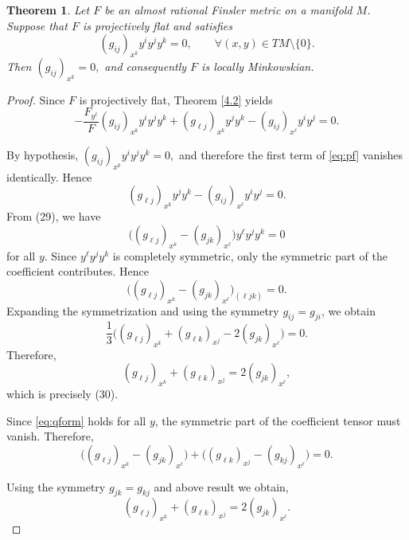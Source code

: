 \documentclass[12pt]{article}
\newtheorem{theorem}{Theorem}[section]
\theoremstyle{definition}
\begin{document}
								\begin{theorem}
									Let $F$ be an almost rational Finsler metric on a manifold $M$. Suppose that $F$ is projectively flat and satisfies
									\[
									(g_{ij})_{x^k}y^iy^jy^k=0,
									\qquad
									\forall (x,y)\in TM\setminus\{0\}.
									\]
									Then $(g_{ij})_{x^k}=0,$ and consequently $F$ is locally Minkowskian.
								\end{theorem}
								
								\begin{proof}
									Since $F$ is projectively flat, Theorem \ref{4.2} yields
									\begin{equation}
									-\frac{F_{y^\ell}}{F}(g_{ij})_{x^k}y^iy^jy^k
									+(g_{\ell j})_{x^k}y^jy^k
									-(g_{ij})_{x^\ell}y^iy^j
									=0.
									\label{eq:pf}
									\end{equation}
									
									By hypothesis, $(g_{ij})_{x^k}y^iy^jy^k=0,$
									and therefore the first term of \eqref{eq:pf} vanishes identically. Hence
									\begin{equation}
									(g_{\ell j})_{x^k}y^jy^k
									-(g_{ij})_{x^\ell}y^iy^j
									=0.
									\label{eq:qform}
									\end{equation}
									From (29), we have
									\[
									\Big((g_{\ell j})_{x^k}-(g_{jk})_{x^\ell}\Big)y^\ell y^j y^k=0
									\]
									for all \(y\). Since \(y^\ell y^j y^k\) is completely symmetric, only the symmetric part of the coefficient contributes. Hence
									\[
									\Big((g_{\ell j})_{x^k}-(g_{jk})_{x^\ell}\Big)_{(\ell jk)}=0.
									\]
									Expanding the symmetrization and using the symmetry \(g_{ij}=g_{ji}\), we obtain
									\[
									\frac13\Big((g_{\ell j})_{x^k}
									+(g_{\ell k})_{x^j}
									-2(g_{jk})_{x^\ell}\Big)=0.
									\]
									Therefore,
									\[
									(g_{\ell j})_{x^k}
									+(g_{\ell k})_{x^j}
									=
									2(g_{jk})_{x^\ell},
									\]
									which is precisely (30).
									
									Since \eqref{eq:qform}
									holds for all \(y\), the symmetric part of the coefficient tensor must vanish. Therefore,
									\[
									\bigl((g_{\ell j})_{x^k}-(g_{jk})_{x^\ell}\bigr)
									+
									\bigl((g_{\ell k})_{x^j}-(g_{kj})_{x^\ell}\bigr)=0.
									\]
									
									
									Using the symmetry \(g_{jk}=g_{kj}\) and above result we obtain,
									\begin{equation}
									(g_{\ell j})_{x^k}
									+
									(g_{\ell k})_{x^j}
									=
									2(g_{jk})_{x^\ell}.
									\label{eq:A}
									\end{equation}
									

\end{proof}
\end{document}
